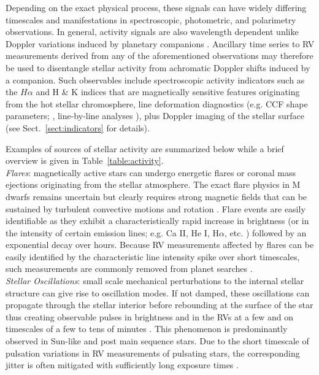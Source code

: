 Depending on the exact physical process, these
signals can have widely differing timescales and manifestations in
spectroscopic, photometric, and polarimetry observations. In general, activity
signals are also wavelength dependent unlike Doppler variations induced by
planetary companions \citep{tal-or18}. Ancillary time series to RV measurements
derived from any of the aforementioned observations may therefore be used to
disentangle stellar activity from achromatic Doppler shifts induced by a companion.
Such observables include spectroscopic activity indicators such as the $H\alpha$ and
\caii{} H \& K indices that are magnetically sensitive features originating from the hot stellar
chromosphere, line deformation diagnostics (e.g. CCF shape parameters; \citealt{boisse11},
line-by-line analyses \citealt{davis17,dumusque18}), plus Doppler imaging of the stellar surface
\citep{hebrard16} (see Sect.~\ref{sect:indicators} for details). 

Examples of sources of stellar activity are summarized below
while a brief overview is given in Table~\ref{table:activity}. \\



\emph{Flares}: magnetically active stars can undergo energetic flares or coronal mass
ejections originating from the stellar atmosphere. The exact flare physics
in M dwarfs remains uncertain but clearly requires strong magnetic fields
that can be sustained by turbulent convective motions and rotation
\citep{browning08}. Flare events are easily identifiable as they
exhibit a characteristically rapid increase in brightness (or in the intensity
of certain emission lines; e.g. Ca II, He I, H$\alpha$, etc. \citealt{schmidt12})
followed by an exponential decay over hours. Because RV
measurements affected by flares can be easily identified by the characteristic
line intensity spike over short timescales, such measurements are commonly
removed from planet searches \citep{reiners09}. \\

\emph{Stellar Oscillations}:
small scale mechanical perturbations to the internal stellar structure
can give rise to oscillation modes. If not damped, these oscillations
can propagate through the stellar interior before rebounding at the surface
of the star thus creating observable pulses in brightness and in the RVs at a
few \mps{} and on timescales of a few to tens of minutes \citep{bedding01}. 
This phenomenon is predominantly observed in Sun-like and post main sequence stars.
Due to the short timescale of
pulsation variations in RV measurements of pulsating stars, the corresponding
jitter is often mitigated with sufficiently long exposure times
\citep{lovis05, dumusque11a}. \\


